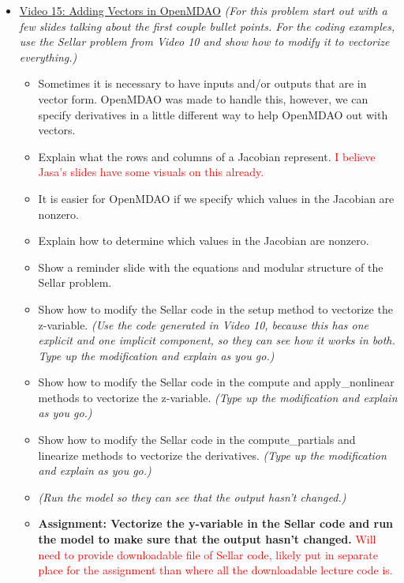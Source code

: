 \documentclass[12pt, letterpaper]{article}
\begin{document}
\begin{itemize}
	\item \underline{Video 15: Adding Vectors in OpenMDAO} \textit{(For this problem start out with a few slides talking about the first couple bullet points. For the coding examples, use the Sellar problem from Video 10 and show how to modify it to vectorize everything.)}
		\begin{itemize}
			\item 	Sometimes it is necessary to have inputs and/or outputs that are in vector form. OpenMDAO was made to handle this, however, we can specify derivatives in a little different way to help OpenMDAO out with vectors.
			\item Explain what the rows and columns of a Jacobian represent. \textcolor{red}{I believe Jasa's slides have some visuals on this already.}
			\item It is easier for OpenMDAO if we specify which values in the Jacobian are nonzero.
			\item Explain how to determine which values in the Jacobian are nonzero.
			\item Show a reminder slide with the equations and modular structure of the Sellar problem.
			\item Show how to modify the Sellar code in the setup method to vectorize the z-variable. \textit{(Use the code generated in Video 10, because this has one explicit and one implicit component, so they can see how it works in both. Type up the modification and explain as you go.)}
			\item Show how to modify the Sellar code in the compute and apply\_nonlinear methods to vectorize the z-variable.  \textit{(Type up the modification and explain as you go.)}
			\item Show how to modify the Sellar code in the compute\_partials and linearize methods to vectorize the derivatives. \textit{(Type up the modification and explain as you go.)}
			\item \textit{(Run the model so they can see that the output hasn’t changed.)}
			\item \textbf{Assignment: Vectorize the y-variable in the Sellar code and run the model to make sure that the output hasn’t changed.} \textcolor{red}{Will need to provide downloadable file of Sellar code, likely put in separate place for the assignment than where all the downloadable lecture code is.}
		\end{itemize}
		

\end{itemize}
\end{document}
